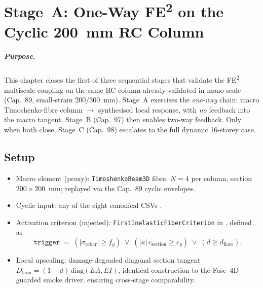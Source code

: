 
\chapter{Stage~A: One-Way FE\textsuperscript{2} on the Cyclic 200~mm RC Column}
\label{ch:fe2-column-one-way}

\paragraph{Purpose.}
This chapter closes the first of three sequential stages that validate
the FE\textsuperscript{2} multiscale coupling on the same RC column already
validated in mono-scale (Cap.~89, small-strain $200/300$~mm). Stage~A
exercises the \emph{one-way} chain: macro Timoshenko-fibre column $\to$
synthesised local response, with \emph{no} feedback into the macro
tangent. Stage~B (Cap.~97) then enables two-way feedback. Only when both
close, Stage~C (Cap.~98) escalates to the full dynamic 16-storey case.

\section{Setup}

\begin{itemize}
  \item Macro element (proxy): \texttt{TimoshenkoBeam3D} fibre, $N=4$
        per column, section $200\times200$~mm; replayed via the
        Cap.~89 cyclic envelopes.
  \item Cyclic input: any of the eight canonical CSVs
        .
  \item Activation criterion (injected): \texttt{FirstInelasticFiberCriterion}
        in , defined as
        \[
          \texttt{trigger}\;=\;
          (|\sigma_{\text{rebar}}|\ge f_y) \;\lor\;
          (|\kappa|\,c_{\text{section}} \ge \varepsilon_y) \;\lor\;
          (d \ge d_{\text{floor}}).
        \]
  \item Local upscaling: damage-degraded diagonal section tangent
        $D_{\text{hom}} = (1-d)\,\mathrm{diag}(EA, EI)$, identical
        construction to the Fase~4D guarded smoke driver, ensuring
        cross-stage comparability.
\end{itemize}

